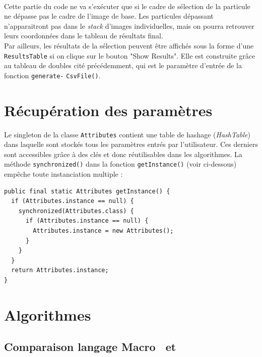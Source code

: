 \paragraph*{}
Cette partie du code ne va s'exécuter que si le cadre de sélection de la particule ne dépasse pas le cadre de l'image de base. Les particules dépassant n'apparaitront pas dans le \textit{stack} d'images individuelles, mais on pourra retrouver leurs coordonnées dans le tableau de résultats final. \\

Par ailleurs, les résultats de la sélection peuvent être affichés sous la forme d'une \texttt{ResultsTable} si on clique sur le bouton "Show Results". Elle est construite grâce au tableau de doubles cité précédemment, qui est le paramètre d'entrée de la fonction \texttt{generate-} \texttt{CsvFile()}. 
\pagebreak
\section{Récupération des paramètres}

Le singleton de la classe \texttt{Attributes} contient une table de hashage (\emph{HashTable}) dans laquelle sont stockés tous les paramètres entrés par l'utilisateur. Ces derniers sont accessibles grâce à des clés et donc réutilisables dans les algorithmes. La méthode  \texttt{synchronized()} dans la fonction \texttt{getInstance()} (voir ci-dessous) empêche toute instanciation multiple :

\begin{center}
\begin{fmpage}{11cm}
\begin{small}
\begin{lstlisting}
public final static Attributes getInstance() {
  if (Attributes.instance == null) {
    synchronized(Attributes.class) {
      if (Attributes.instance == null) {
        Attributes.instance = new Attributes();
      }
    }
  }
  return Attributes.instance;
}
\end{lstlisting}
\end{small}	
\end{fmpage}
\end{center}


\section{Algorithmes}

\subsection{Comparaison langage Macro \imj ~et \java}


